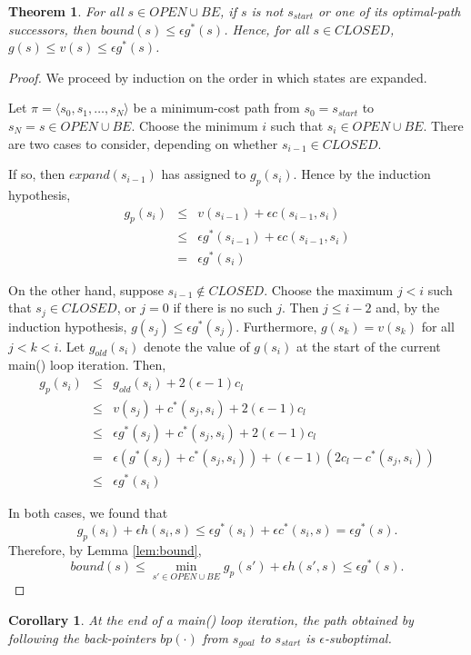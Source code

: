 \documentclass[letterpaper]{article}
\newtheorem{thm}{Theorem}
\newtheorem{cor}{Corollary}
\begin{document}
\begin{thm}
\label{thm:subopt}
For all $s\in OPEN\cup BE$, if $s$ is not $s_{start}$ or one of its optimal-path successors, then $bound(s) \le \epsilon g^*(s)$. Hence, for all $s\in CLOSED$, $g(s) \le v(s) \le \epsilon g^*(s)$.
\end{thm}

\begin{proof}
We proceed by induction on the order in which states are expanded.

Let $\pi = \langle s_0,s_1,\ldots,s_N \rangle$ be a minimum-cost path from $s_0 = s_{start}$ to $s_N = s\in OPEN\cup BE$. Choose the minimum $i$ such that $s_i\in OPEN\cup BE$.
There are two cases to consider, depending on whether $s_{i-1}\in CLOSED$.

If so, then $expand(s_{i-1})$ has assigned to $g_p(s_i)$. Hence by the induction hypothesis,
\begin{eqnarray*}
g_p(s_i) &\le& v(s_{i-1}) + \epsilon c(s_{i-1},s_i)
\\&\le& \epsilon g^*(s_{i-1}) + \epsilon c(s_{i-1},s_i)
\\&=& \epsilon g^*(s_i)
\end{eqnarray*}

On the other hand, suppose $s_{i-1}\notin CLOSED$. Choose the maximum $j<i$ such that $s_j\in CLOSED$, or $j=0$ if there is no such $j$. Then $j\le i-2$ and, by the induction hypothesis, $g(s_j)\le \epsilon g^*(s_j)$. Furthermore, $g(s_k) = v(s_k)$ for all $j<k<i$. Let $g_{old}(s_i)$ denote the value of $g(s_i)$ at the start of the current main() loop iteration. Then,
\begin{eqnarray*}
g_p(s_i) &\le& g_{old}(s_i) + 2(\epsilon-1)c_l
\\&\le& v(s_j) + c^*(s_j,s_i) + 2(\epsilon-1)c_l
\\&\le& \epsilon g^*(s_j) + c^*(s_j,s_i) + 2(\epsilon-1)c_l
\\&=& \epsilon (g^*(s_j) + c^*(s_j,s_i)) + (\epsilon-1)(2c_l - c^*(s_j,s_i))
\\&\le& \epsilon g^*(s_i)
\end{eqnarray*}

In both cases, we found that
\[g_p(s_i) + \epsilon h(s_i,s) \le \epsilon g^*(s_i) + \epsilon c^*(s_i,s) = \epsilon g^*(s).\]
Therefore, by Lemma \ref{lem:bound},
\[bound(s) \le \min_{s' \in OPEN \cup BE} g_p(s') + \epsilon h(s',s) \le \epsilon g^*(s).\]
\end{proof}

\begin{cor}
\label{cor:subopt}
At the end of a main() loop iteration, the path obtained by following the back-pointers $bp(\cdot)$ from $s_{goal}$ to $s_{start}$ is $\epsilon$-suboptimal.
\end{cor}
\end{document}
